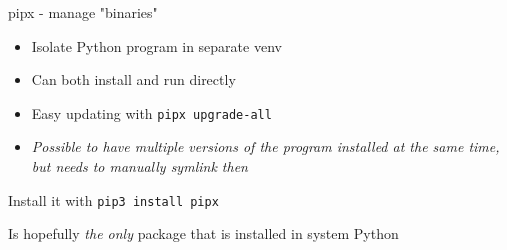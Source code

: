 \begin{frame}{pipx - manage "binaries"}
  \begin{itemize}
    \item Isolate Python program in separate venv
    \item Can both install and run directly
    \item Easy updating with \texttt{pipx upgrade-all}
    \item \emph{Possible to have multiple versions of the program installed at the same time, but needs to manually symlink then}
  \end{itemize}

  Install it with \texttt{pip3 install pipx}

  Is hopefully \emph{the only} package that is installed in system Python
\end{frame}
